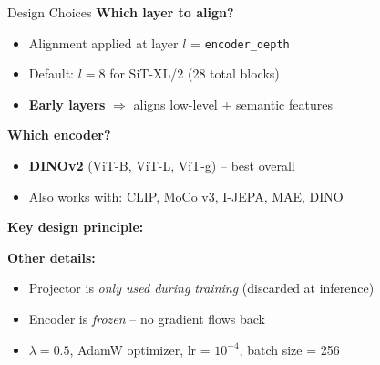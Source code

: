 \documentclass[aspectratio=169, 10pt]{beamer}
\begin{document}
\begin{frame}{Design Choices}
\textbf{Which layer to align?}
\begin{itemize}
  \item Alignment applied at layer $l$ = \texttt{encoder\_depth}
  \item Default: $l = 8$ for SiT-XL/2 (28 total blocks)
  \item \textbf{Early layers} $\Rightarrow$ aligns low-level + semantic features
\end{itemize}

\vspace{0.5em}
\textbf{Which encoder?}
\begin{itemize}
  \item \textbf{DINOv2} (ViT-B, ViT-L, ViT-g) -- best overall
  \item Also works with: CLIP, MoCo v3, I-JEPA, MAE, DINO
\end{itemize}

\vspace{0.5em}
\textbf{Key design principle:}
\begin{center}
\end{center}

\vspace{0.3em}
\textbf{Other details:}
\begin{itemize}
  \item Projector is \textit{only used during training} (discarded at inference)
  \item Encoder is \textit{frozen} -- no gradient flows back
  \item $\lambda = 0.5$, AdamW optimizer, lr = $10^{-4}$, batch size = 256
\end{itemize}
\end{frame}
\end{document}
